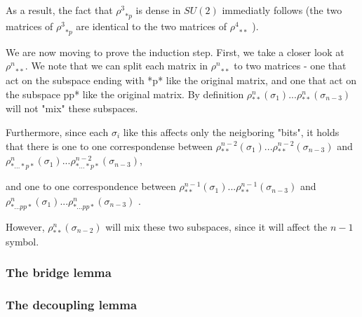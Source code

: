 \documentclass{article}
\begin{document}
As a result, the fact that ${\rho^{3}}_{*p}$ is dense in  $SU(2)$ immediatly follows (the two matrices of ${\rho^{3}}_{*p}$  are identical to the two matrices of ${\rho^{4}}_{**}$ ).

We are now moving to prove the induction step. First, we take a closer look at  ${\rho^{n}}_{**}$. We note that we can split each matrix in ${\rho^{n}}_{**}$ to two matrices - one that act on the subspace ending with *p* like the original matrix, and one that act on the subspace pp* like the original matrix. By definition $\rho^{n}_{**}(\sigma_{1}) ... \rho^{n}_{**}(\sigma_{n-3})$ will not "mix" these subspaces.

Furthermore, since each $\sigma_{i}$ like this affects only the neigboring "bits", it holds that there is one to one correspondense between $\rho^{n-2}_{**}(\sigma_{1}) ... \rho^{n-2}_{**}(\sigma_{n-3})$ and $\rho^{n}_{*...*p*}(\sigma_{1}) ... \rho^{n-2}_{*...*p*}(\sigma_{n-3})$, 

and one to one correspondence between $\rho^{n-1}_{**}(\sigma_{1}) ... \rho^{n-1}_{**}(\sigma_{n-3})$ and $\rho^{n}_{*...pp*}(\sigma_{1}) ... \rho^{n}_{*...pp*}(\sigma_{n-3})$ .

However, $\rho^{n}_{**}(\sigma_{n-2})$ will mix these two subspaces, since it will affect the $n-1$ symbol.






\subsubsection{The bridge lemma}
\subsubsection{The decoupling lemma}
\end{document}
